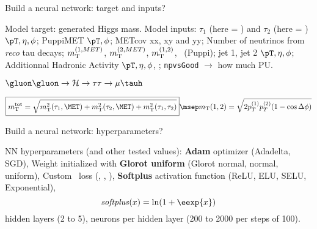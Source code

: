 \begin{frame}{Build a neural network: target and inputs?}

\begin{minipage}[c]{.49\textwidth}
\manip Model target: generated Higgs mass.
\manip Model inputs:
\submanip $\tau_1$ (here = \muon) and $\tau_2$ (here = \tauh) $\pT, \eta, \phi$;
\submanip PuppiMET $\pT, \phi$;
\submanip METcov xx, xy and yy;
\submanip Number of neutrinos from \emph{reco} tau decays;
\submanip $m_{\mathrm{T}}^{(1,MET)}$, $m_{\mathrm{T}}^{(2,MET)}$, $m_{\mathrm{T}}^{(1,2)}$, \mTtot\ (Puppi);
\submanip jet 1, jet 2 $\pT, \eta, \phi$;
\submanip Additionnal Hadronic Activity $\pT, \eta, \phi$, \Njetsr;
\submanip \texttt{npvsGood} $\rightarrow$ how much PU.
\end{minipage}
\hfill
\begin{minipage}[c]{.48\textwidth}
\begin{block}{$\gluon\gluon\to\Higgs\to\tau\tau\to\mu\tauh$}
\begin{center}

\vspace{2\baselineskip}



\vspace{2\baselineskip}

\end{center}
\end{block}
\end{minipage}

\vfill

\begin{equation*}
\boxed{\mTtot = \sqrt{\mT^2(\tau_1,\MET) + \mT^2(\tau_2,\MET) + \mT^2(\tau_1,\tau_2)}}
\msep
\mT(1,2) = \sqrt{2p_T^{(1)} p_T^{(2)} (1-\cos\Delta\phi)}
\end{equation*}

\end{frame}

\begin{frame}{Build a neural network: hyperparameters?}

\manip NN hyperparameters (and other tested values):
\submanip \textbf{Adam} optimizer (Adadelta, SGD),
\submanip Weight initialized with \textbf{Glorot uniform} (Glorot normal, normal, uniform),
\submanip Custom \LossMAPEsqrtb\ loss (\LossMAPE, \LossMAE, \LossMSE),
\submanip \textbf{Softplus} activation function (ReLU, ELU, SELU, Exponential),
\begin{equation*}
\mathit{softplus}(x) = \ln(1+\eexp{x})
\end{equation*}
 hidden layers (2 to 5),
 neurons per hidden layer (200 to 2000 per steps of 100).
\end{frame}

